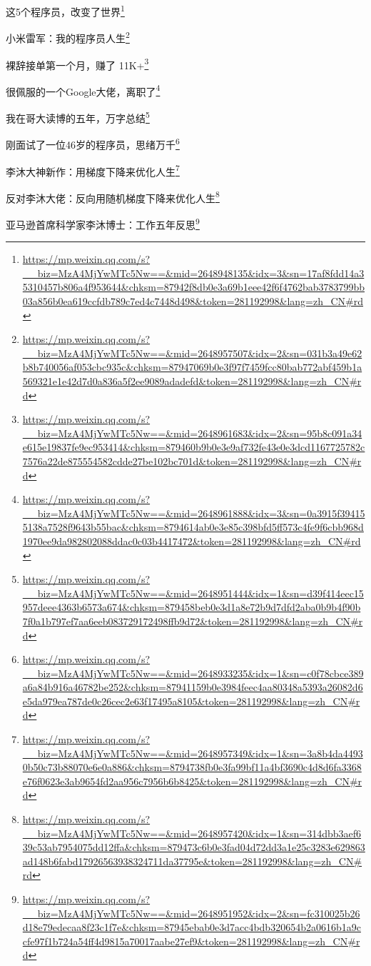 \documentclass[]{ctexbook}
\renewcommand{\href}[2]{#2\footnote{\url{#1}}}
\begin{document}
\href{https://mp.weixin.qq.com/s?__biz=MzA4MjYwMTc5Nw==\&mid=2648948135\&idx=3\&sn=17af8fdd14a35310457b806a4f953644\&chksm=87942f8db0e3a69b1eee42f6f4762bab3783799bb03a856b0ea619ccfdb789c7ed4c7448d498\&token=281192998\&lang=zh_CN\#rd}{这5个程序员，改变了世界}

\href{https://mp.weixin.qq.com/s?__biz=MzA4MjYwMTc5Nw==\&mid=2648957507\&idx=2\&sn=031b3a49e62b8b740056af053cbc935c\&chksm=87947069b0e3f97f7459fcc80bab772abf459b1a569321e1e42d7d0a836a5f2ee9089adadefd\&token=281192998\&lang=zh_CN\#rd}{小米雷军：我的程序员人生}

\href{https://mp.weixin.qq.com/s?__biz=MzA4MjYwMTc5Nw==\&mid=2648961683\&idx=2\&sn=95b8c091a34e615e19837fe9ec953414\&chksm=879460b9b0e3e9af732fe43e0e3dcd1167725782c7576a22de875554582cdde27be102bc701d\&token=281192998\&lang=zh_CN\#rd}{裸辞接单第一个月，赚了 11K+}

\href{https://mp.weixin.qq.com/s?__biz=MzA4MjYwMTc5Nw==\&mid=2648961888\&idx=3\&sn=0a3915f394155138a7528f9643b55bac\&chksm=8794614ab0e3e85c398bfd5ff573c4fe9f6cbb968d1970ee9da982802088ddac0c03b4417472\&token=281192998\&lang=zh_CN\#rd}{很佩服的一个Google大佬，离职了}

\href{https://mp.weixin.qq.com/s?__biz=MzA4MjYwMTc5Nw==\&mid=2648951444\&idx=1\&sn=d39f414eec15957deee4363b6573a674\&chksm=879458beb0e3d1a8e72b9d7dfd2aba0b9b4f90b7f0a1b797ef7aa6eeb083729172498ffb9d72\&token=281192998\&lang=zh_CN\#rd}{我在哥大读博的五年，万字总结}

\href{https://mp.weixin.qq.com/s?__biz=MzA4MjYwMTc5Nw==\&mid=2648933235\&idx=1\&sn=c0f78cbce389a6a84b916a46782be252\&chksm=87941159b0e3984feec4aa80348a5393a26082d6e5da979ea787de0c26cec2e63f17495a8105\&token=281192998\&lang=zh_CN\#rd}{刚面试了一位46岁的程序员，思绪万千}

\href{https://mp.weixin.qq.com/s?__biz=MzA4MjYwMTc5Nw==\&mid=2648957349\&idx=1\&sn=3a8b4da44930b50c73b88070e6e0a886\&chksm=8794738fb0e3fa99bf11a4bf3690c4d8d6fa3368e76f0623e3ab9654fd2aa956c7956b6b8425\&token=281192998\&lang=zh_CN\#rd}{李沐大神新作：用梯度下降来优化人生}

\href{https://mp.weixin.qq.com/s?__biz=MzA4MjYwMTc5Nw==\&mid=2648957420\&idx=1\&sn=314dbb3aef639c53ab7954075dd12ffa\&chksm=879473c6b0e3fad04d72dd3a1e25c3283e629863ad148b6fabd17926563938324711da37795e\&token=281192998\&lang=zh_CN\#rd}{反对李沐大佬：反向用随机梯度下降来优化人生}

\href{https://mp.weixin.qq.com/s?__biz=MzA4MjYwMTc5Nw==\&mid=2648951952\&idx=2\&sn=fc310025b26d18e79edecaa8f23c1f7e\&chksm=87945ebab0e3d7acc4bdb320654b2a0616b1a9ccfe97f1b724a54ff4d9815a70017aabe27ef9\&token=281192998\&lang=zh_CN\#rd}{亚马逊首席科学家李沐博士：工作五年反思}
\end{document}
